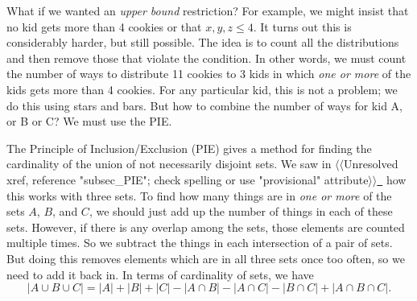 \documentclass[10pt,]{book}
\theoremstyle{plain}
\theoremstyle{definition}
\theoremstyle{definition}
\theoremstyle{definition}
\theoremstyle{definition}
\numberwithin{equation}{chapter}
\begin{document}
\par
\hypertarget{p-947}{}%
What if we wanted an \emph{upper bound} restriction? For example, we might insist that no kid gets more than 4 cookies or that \(x, y, z \le 4\). It turns out this is considerably harder, but still possible. The idea is to count all the distributions and then remove those that violate the condition. In other words, we must count the number of ways to distribute 11 cookies to 3 kids in which \emph{one or more} of the kids gets more than 4 cookies. For any particular kid, this is not a problem; we do this using stars and bars. But how to combine the number of ways for kid A, or B or C? We must use the PIE.%
\par
\hypertarget{p-948}{}%
The Principle of Inclusion/Exclusion (PIE) gives a method for finding the cardinality of the union of not necessarily disjoint sets. We saw in {$\langle\langle$Unresolved xref, reference "subsec\_PIE"; check spelling or use "provisional" attribute$\rangle\rangle$}\hyperlink{}{~} how this works with three sets. To find how many things are in \emph{one or more} of the sets \(A\), \(B\), and \(C\), we should just add up the number of things in each of these sets. However, if there is any overlap among the sets, those elements are counted multiple times. So we subtract the things in each intersection of a pair of sets. But doing this removes elements which are in all three sets once too often, so we need to add it back in. In terms of cardinality of sets, we have%
\begin{equation*}
|A \cup B \cup C| = |A| + |B| + |C| - |A \cap B| - |A \cap C| - |B \cap C| + |A\cap B \cap C|.
\end{equation*}
%
\end{document}
